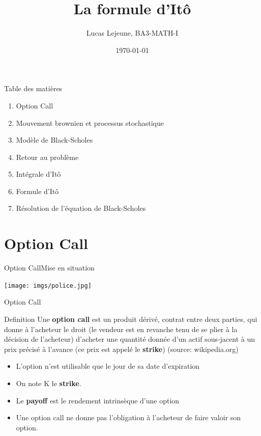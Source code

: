 \documentclass{beamer}
\title{La formule d'Itô}
\date{\today}
\author{Lucas Lejeune, BA3-MATH-I}
\newcommand{\1}{\mathmybb{1}}
\begin{document}
\frame{\titlepage}

\begin{frame}{Table des matières}
  \begin{enumerate}
    \item Option Call
    \item Mouvement brownien et processus stochastique
    \item Modèle de Black-Scholes
    \item Retour au problème
    \item Intégrale d'Itô
    \item Formule d'Itô
    \item Résolution de l'équation de Black-Scholes
  \end{enumerate}
\end{frame}
\section{Option Call}
\begin{frame}{Option Call}{Mise en situation}
  \begin{center}
    \texttt{[image: imgs/police.jpg]}
    \end{center}
\end{frame}
\begin{frame}{Option Call}
  \begin{block}{Definition}
    Une \textbf{option call} est un produit dérivé, contrat entre deux parties, qui donne à l'acheteur le droit (le vendeur est en revanche tenu de se plier à la décision de l'acheteur) d'acheter une quantité donnée d'un actif sous-jacent à un prix précisé à l'avance (ce prix est appelé le \textbf{strike}) (source: wikipedia.org)
  \end{block}
  \pause
  \begin{itemize}
  \item L'option n'est utilisable que le jour de sa date d'expiration
  \item On note K le \textbf{strike}.
  \item Le \textbf{payoff} est le rendement intrinsèque d'une option
    \item Une option call ne donne pas l'obligation à l'acheteur de faire valoir son option.
  \end{itemize}
\end{frame}
\end{document}
